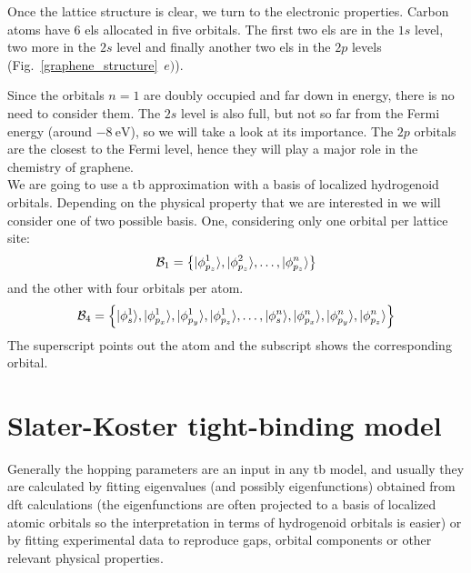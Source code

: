 Once the lattice structure is clear, we turn to the electronic properties. Carbon atoms have 6 \acp{el} allocated in five orbitals. The first two \acp{el} are in the $1s$ level, two more in the $2s$ level and finally another two \acp{el} in the $2p$ levels (Fig.~\ref{graphene_structure}~$e)$).

Since the orbitals $n=1$ are doubly occupied and far down in energy, there is no need to consider them. The $2s$ level is also full, but not so far from the Fermi energy (around $\SI{-8}{\eV}$), so we will take a look at its importance. The $2p$ orbitals are the closest to the Fermi level, hence they will play a major role in the chemistry of graphene.\\

We are going to use a \ac{tb} approximation with a basis of localized hydrogenoid orbitals. Depending on the physical property that we are interested in we will consider one of two possible basis.
One, considering only one orbital per lattice site:
\begin{equation}
  \mathcal{B}_1 = \left\{|\phi^1_{p_z}\rangle, |\phi^2_{p_z}\rangle,\dots, |\phi^n_{p_z}\rangle\right\}
\label{basis1}
\end{equation}
and the other with four orbitals per atom.
\begin{equation}
  \mathcal{B}_4 = \left\{
  |\phi^1_{s}\rangle,|\phi^1_{p_x}\rangle,|\phi^1_{p_y}\rangle,|\phi^1_{p_z}\rangle,
  \dots,
  |\phi^n_{s}\rangle,|\phi^n_{p_x}\rangle,|\phi^n_{p_y}\rangle,|\phi^n_{p_z}\rangle
  \right\}
\label{basis4}
\end{equation}
The superscript points out the atom and the subscript shows the corresponding orbital.



\section{Slater-Koster tight-binding model}
\label{ssec:SK}
Generally the hopping parameters are an input in any \ac{tb} model, and usually they are calculated by fitting eigenvalues (and possibly eigenfunctions) obtained from \ac{dft} calculations (the eigenfunctions are often projected to a basis of localized atomic orbitals so the interpretation in terms of hydrogenoid orbitals is easier) or by fitting experimental data to reproduce gaps, orbital components or other relevant physical properties.

